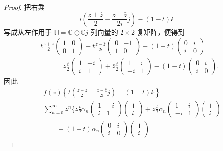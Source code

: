 \begin{proof}
把右乘
\[
 t\left(\frac{z+\bar z}{2}-\frac{z-\bar z}{2i}j\right)
 -(1-t)k
\]
写成从左作用于 $\mathbb H=\mathbb C\oplus\mathbb Cj$ 列向量的
$2\times2$ 复矩阵，便得到
\[
\begin{aligned}
 &t\frac{z+\bar z}{2}
   \begin{pmatrix}1&0\\0&1\end{pmatrix}
 -t\frac{z-\bar z}{2i}
   \begin{pmatrix}0&-1\\1&0\end{pmatrix}
 -(1-t)\begin{pmatrix}0&i\\i&0\end{pmatrix}
 \\
 &\qquad={}
 z\frac t2\begin{pmatrix}1&-i\\i&1\end{pmatrix}
 +\bar z\frac t2\begin{pmatrix}1&i\\-i&1\end{pmatrix}
 -(1-t)\begin{pmatrix}0&i\\i&0\end{pmatrix}.
\end{aligned}
\]
因此
\[
\begin{aligned}
 &f(z)\left\{
 t\left(\frac{z+\bar z}{2}-\frac{z-\bar z}{2i}j\right)
 -(1-t)k
 \right\}
 \\
 ={}&\sum_{n=0}^{\infty}z^n\Biggl\{
 z\frac t2\alpha_n
  \begin{pmatrix}1&-i\\i&1\end{pmatrix}
  \begin{pmatrix}1\\i\end{pmatrix}
 +\bar z\frac t2\alpha_n
  \begin{pmatrix}1&i\\-i&1\end{pmatrix}
  \begin{pmatrix}1\\i\end{pmatrix}
 \\
 &\qquad
 -(1-t)\alpha_n
  \begin{pmatrix}0&i\\i&0\end{pmatrix}
  \begin{pmatrix}1\\i\end{pmatrix}

\end{aligned}\]
\end{proof}
